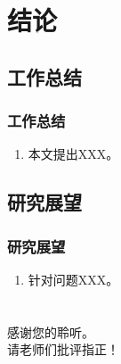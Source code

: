 \documentclass[AutoFakeBold,AutoFakeSlant]{beamer}
\begin{document}
\section{结论}

\subsection{工作总结}
\begin{frame}
  \frametitle{工作总结}

  \begin{enumerate}
    \item 本文提出XXX。
  \end{enumerate}
\end{frame}

\subsection{研究展望}
\begin{frame}
  \frametitle{研究展望}

  \begin{enumerate}
    \item 针对问题XXX。
  \end{enumerate}
\end{frame}

\section{}
\begin{frame}[plain]
  
    \LARGE{
    感谢您的聆听。\\
    请老师们批评指正！}
  
\end{frame}
\end{document}

